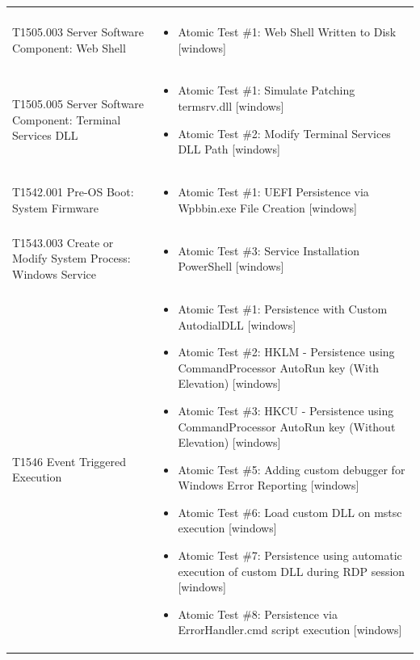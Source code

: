 \begin{longtable}{p{} p{}}
\begin{itemize}[leftmargin=*, nosep, topsep=0pt]
\end{itemize} \\ [1.5ex]
T1505.003 Server Software Component: Web Shell & \begin{itemize}[leftmargin=*, nosep, topsep=0pt]
  \item Atomic Test \#1: Web Shell Written to Disk [windows]
\end{itemize} \\ [1.5ex]
T1505.005 Server Software Component: Terminal Services DLL & \begin{itemize}[leftmargin=*, nosep, topsep=0pt]
  \item Atomic Test \#1: Simulate Patching termsrv.dll [windows]
  \item Atomic Test \#2: Modify Terminal Services DLL Path [windows]
\end{itemize} \\ [1.5ex]
T1542.001 Pre-OS Boot: System Firmware & \begin{itemize}[leftmargin=*, nosep, topsep=0pt]
  \item Atomic Test \#1: UEFI Persistence via Wpbbin.exe File Creation [windows]
\end{itemize} \\ [1.5ex]
T1543.003 Create or Modify System Process: Windows Service & \begin{itemize}[leftmargin=*, nosep, topsep=0pt]
  \item Atomic Test \#3: Service Installation PowerShell [windows]
\end{itemize} \\ [1.5ex]
T1546 Event Triggered Execution & \begin{itemize}[leftmargin=*, nosep, topsep=0pt]
  \item Atomic Test \#1: Persistence with Custom AutodialDLL [windows]
  \item Atomic Test \#2: HKLM - Persistence using CommandProcessor AutoRun key (With Elevation) [windows]
  \item Atomic Test \#3: HKCU - Persistence using CommandProcessor AutoRun key (Without Elevation) [windows]
  \item Atomic Test \#5: Adding custom debugger for Windows Error Reporting [windows]
  \item Atomic Test \#6: Load custom DLL on mstsc execution [windows]
  \item Atomic Test \#7: Persistence using automatic execution of custom DLL during RDP session [windows]
  \item Atomic Test \#8: Persistence via ErrorHandler.cmd script execution [windows]

\end{itemize}
\end{longtable}
